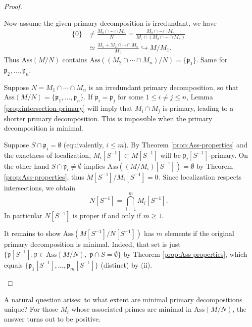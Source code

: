 \begin{proof}
\begin{asparaenum}[(i)]
		Now assume the given primary decomposition is irredundant, we have
			\begin{align*}
				\{0\} & \neq \frac{M_2 \cap \cdots \cap M_n}{N} = \frac{M_2 \cap \cdots \cap M_n}{M_1 \cap (M_2 \cap \cdots \cap M_n)} \\
				& \simeq \frac{M_1 + M_2 \cap \cdots \cap M_n}{M_1} \hookrightarrow M/M_1.
			\end{align*}
			Thus $\text{Ass}(M/N)$ contains $\text{Ass}((M_2 \cap \cdots \cap M_n)/N) = \{\mathfrak{p}_1\}$. Same for $\mathfrak{p}_2, \ldots, \mathfrak{p}_n$.
		\item Suppose $N = M_1 \cap \cdots \cap M_n$ is an irredundant primary decomposition, so that $\text{Ass}(M/N) = \{ \mathfrak{p}_1, \ldots, \mathfrak{p}_n \}$. If $\mathfrak{p}_i = \mathfrak{p}_j$ for some $1 \leq i \neq j \leq n$, Lemma \ref{prop:intersection-primary} will imply that $M_i \cap M_j$ is primary, leading to a shorter primary decomposition. This is impossible when the primary decomposition is minimal.
		\item Suppose $S \cap \mathfrak{p}_i = \emptyset$ (equivalently, $i \leq m$). By Theorem \ref{prop:Ass-properties} and the exactness of localization, $M_i[S^{-1}] \subset M[S^{-1}]$ will be $\mathfrak{p}_i[S^{-1}]$-primary. On the other hand $S \cap \mathfrak{p}_i \neq \emptyset$ implies $\text{Ass}((M/M_i)[S^{-1}]) = \emptyset$ by Theorem \ref{prop:Ass-properties}, thus $M[S^{-1}]/M_i[S^{-1}] = 0$. Since localization respects intersections, we obtain
		\[ N[S^{-1}] = \bigcap_{i=1}^m M_i[S^{-1}]. \]
		In particular $N[S^{-1}]$ is proper if and only if $m \geq 1$.
	
		It remains to show $\text{Ass}(M[S^{-1}]/N[S^{-1}])$ has $m$ elements if the original primary decomposition is minimal. Indeed, that set is just $\{ \mathfrak{p}[S^{-1}] : \mathfrak{p} \in \text{Ass}(M/N), \; \mathfrak{p} \cap S = \emptyset \}$ by Theorem \ref{prop:Ass-properties}, which equals $\{ \mathfrak{p}_1[S^{-1}], \ldots, \mathfrak{p}_m[S^{-1}] \}$ (distinct) by (ii).
	\end{asparaenum}
\end{proof}

A natural question arises: to what extent are minimal primary decompositions unique? For those $M_i$ whose associated primes are minimal in $\text{Ass}(M/N)$, the answer turns out to be positive.


